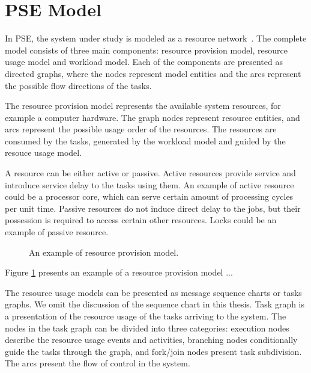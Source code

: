 
\section{PSE Model}

In PSE, the system under study is modeled as a resource network~\cite{Menasce:1994:CPP:174466}. The complete model consists of three main components: resource provision model, resource usage model and workload model. Each of the components are presented as directed graphs, where the nodes represent model entities and the arcs represent the possible flow directions of the tasks.

The resource provision model represents the available system resources, for example a computer hardware. The graph nodes represent resource entities, and arcs represent the possible usage order of the resources. The resources are consumed by the tasks, generated by the workload model and guided by the resouce usage model.

A resource can be either active or passive. Active resources provide service and introduce service delay to the tasks using them. An example of active resource could be a processor core, which can serve certain amount of processing cycles per unit time. Passive resources do not induce direct delay to the jobs, but their possession is required to access certain other resources. Locks  could be an example of passive resource.

\begin{figure}[]
  \begin{center}
    \caption{An example of resource provision model.}
    \label{fig:resource-provision-model}
  \end{center}

\end{figure}

Figure \ref{fig:resource-provision-model} presents an example of a resource provision model ...

The resource usage models can be presented as message sequence charts or tasks graphs. We omit the discussion of the sequence chart in this thesis. Task graph is a presentation of the resource usage of the tasks arriving to the system. The nodes in the task graph can be divided into three categories: execution nodes describe the resource usage events and activities, branching nodes conditionally guide the tasks through the graph, and fork/join nodes present task subdivision. The arcs present the flow of control in the system.

